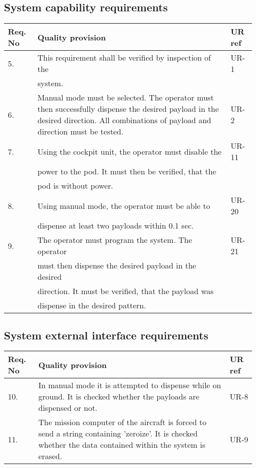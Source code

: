 \subsection{System capability requirements}
\begin{center}
    \begin{tabular}{ | l | p{9cm} | l |}
    \hline	  
    Req. No & Quality provision  									& UR ref \\ \hline
		5. & This requirement shall be verified by inspection of the  & UR-1 \\
            & system.                                               &\\ \hline
		6. & Manual mode must be selected. The operator must then successfully dispense the desired payload in the desired direction. All combinations of payload and direction must be tested.                               &UR-2\\ \hline
		7. & Using the cockpit unit, the operator must disable the	& UR-11 \\
			& power to the pod. It must then be verified, that the	&\\
			& pod is without power.                                 &\\ \hline	
        8. & Using manual mode, the operator must be able to       & UR-20 \\
			& dispense at least two payloads within 0.1 sec.        &\\ \hline	 
        9. & The operator must program the system. The operator    & UR-21 \\
			& must then dispense the desired payload in the desired &\\ 
            & direction. It must be verified, that the payload was  &\\    
            & dispense in the desired pattern.                      &\\ \hline	            
    \end{tabular}
\end{center}

\subsection{System external interface requirements}
\begin{center}
    \begin{tabular}{ | l | p{9cm} | l |}
    \hline
    Req. No & Quality provision  & UR ref \\ \hline
    10. & In manual mode it is attempted to dispense while on ground. It is checked whether the payloads are dispensed or not. & UR-8 \\ \hline
    11. & The mission computer of the aircraft is forced to send a string containing 'zeroize'. It is checked whether the data contained within the system is erased. & UR-9 \\ \hline
    \end{tabular}
\end{center}


